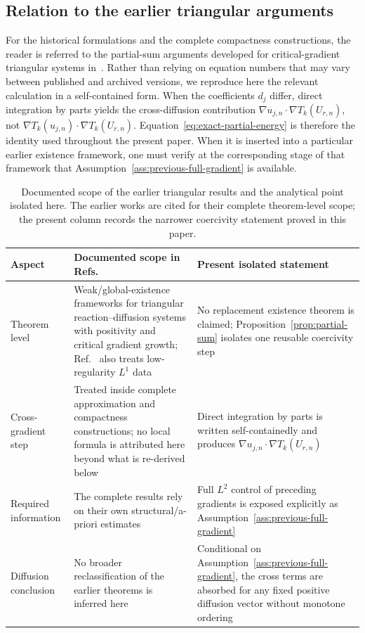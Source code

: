 \subsection{Relation to the earlier triangular arguments}

For the historical formulations and the complete compactness constructions, the reader is referred to the partial-sum arguments developed for critical-gradient triangular systems in~\cite{alaa2013triangular,bouarifi2015climate}. Rather than relying on equation numbers that may vary between published and archived versions, we reproduce here the relevant calculation in a self-contained form. When the coefficients $d_j$ differ, direct integration by parts yields the cross-diffusion contribution $\nabla u_{j,n}\cdot\nabla T_k(U_{r,n})$, not $\nabla T_k(u_{j,n})\cdot\nabla T_k(U_{r,n})$. Equation~\eqref{eq:exact-partial-energy} is therefore the identity used throughout the present paper. When it is inserted into a particular earlier existence framework, one must verify at the corresponding stage of that framework that Assumption~\ref{ass:previous-full-gradient} is available.

\begin{table}[H]
\centering
\caption{Documented scope of the earlier triangular results and the analytical point isolated here. The earlier works are cited for their complete theorem-level scope; the present column records the narrower coercivity statement proved in this paper.}
\label{tab:prior-present}
\small
\begin{tabularx}{\textwidth}{@{}p{3.0cm}XX@{}}
\toprule
Aspect & Documented scope in Refs.~\cite{alaa2013triangular,bouarifi2015climate} & Present isolated statement \\ \midrule
Theorem level & Weak/global-existence frameworks for triangular reaction--diffusion systems with positivity and critical gradient growth; Ref.~\cite{alaa2013triangular} also treats low-regularity $L^1$ data & No replacement existence theorem is claimed; Proposition~\ref{prop:partial-sum} isolates one reusable coercivity step \\[1mm]
Cross-gradient step & Treated inside complete approximation and compactness constructions; no local formula is attributed here beyond what is re-derived below & Direct integration by parts is written self-containedly and produces $\nabla u_{j,n}\!\cdot\!\nabla T_k(U_{r,n})$ \\[1mm]
Required information & The complete results rely on their own structural/a-priori estimates & Full $L^2$ control of preceding gradients is exposed explicitly as Assumption~\ref{ass:previous-full-gradient} \\[1mm]
Diffusion conclusion & No broader reclassification of the earlier theorems is inferred here & Conditional on Assumption~\ref{ass:previous-full-gradient}, the cross terms are absorbed for any fixed positive diffusion vector without monotone ordering \\ \bottomrule
\end{tabularx}
\end{table}

